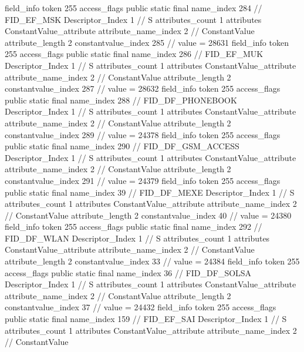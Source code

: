 {{{{{{				}
			}
			field_info {
				token	255
				access_flags	public static final
				name_index	284		// FID_EF_MSK
				Descriptor_Index	1		// S
				attributes_count	1
				attributes {
				ConstantValue_attribute {
					attribute_name_index	2		// ConstantValue
					attribute_length	2
					constantvalue_index	285		// value = 28631
				}
				}
			}
			field_info {
				token	255
				access_flags	public static final
				name_index	286		// FID_EF_MUK
				Descriptor_Index	1		// S
				attributes_count	1
				attributes {
				ConstantValue_attribute {
					attribute_name_index	2		// ConstantValue
					attribute_length	2
					constantvalue_index	287		// value = 28632
				}
				}
			}
			field_info {
				token	255
				access_flags	public static final
				name_index	288		// FID_DF_PHONEBOOK
				Descriptor_Index	1		// S
				attributes_count	1
				attributes {
				ConstantValue_attribute {
					attribute_name_index	2		// ConstantValue
					attribute_length	2
					constantvalue_index	289		// value = 24378
				}
				}
			}
			field_info {
				token	255
				access_flags	public static final
				name_index	290		// FID_DF_GSM_ACCESS
				Descriptor_Index	1		// S
				attributes_count	1
				attributes {
				ConstantValue_attribute {
					attribute_name_index	2		// ConstantValue
					attribute_length	2
					constantvalue_index	291		// value = 24379
				}
				}
			}
			field_info {
				token	255
				access_flags	public static final
				name_index	39		// FID_DF_MEXE
				Descriptor_Index	1		// S
				attributes_count	1
				attributes {
				ConstantValue_attribute {
					attribute_name_index	2		// ConstantValue
					attribute_length	2
					constantvalue_index	40		// value = 24380
				}
				}
			}
			field_info {
				token	255
				access_flags	public static final
				name_index	292		// FID_DF_WLAN
				Descriptor_Index	1		// S
				attributes_count	1
				attributes {
				ConstantValue_attribute {
					attribute_name_index	2		// ConstantValue
					attribute_length	2
					constantvalue_index	33		// value = 24384
				}
				}
			}
			field_info {
				token	255
				access_flags	public static final
				name_index	36		// FID_DF_SOLSA
				Descriptor_Index	1		// S
				attributes_count	1
				attributes {
				ConstantValue_attribute {
					attribute_name_index	2		// ConstantValue
					attribute_length	2
					constantvalue_index	37		// value = 24432
				}
				}
			}
			field_info {
				token	255
				access_flags	public static final
				name_index	159		// FID_EF_SAI
				Descriptor_Index	1		// S
				attributes_count	1
				attributes {
				ConstantValue_attribute {
					attribute_name_index	2		// ConstantValue
}}}}}}}

